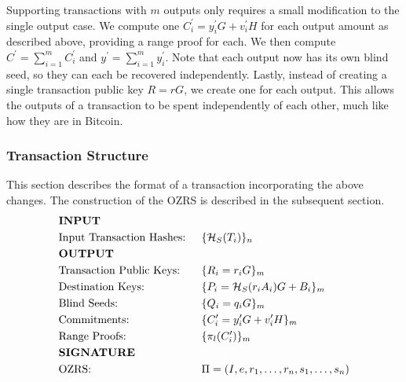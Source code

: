 \documentclass{article}
\newcommand{\sidx}{\ensuremath{*}}
\newcommand{\sx}{\ensuremath{x_\sidx}}
\newcommand{\oy}{\ensuremath{y^\prime}}
\newcommand{\oiy}{\ensuremath{y^\prime_i}}
\newcommand{\oC}{\ensuremath{C^\prime}}
\newcommand{\oiC}{\ensuremath{C^\prime_i}}
\newcommand{\oiv}{\ensuremath{v^\prime_i}}
\newcommand{\hs}{\ensuremath{\mathcal{H}_S}}
\newcommand{\hp}{\ensuremath{\mathcal{H}_P}}
\begin{document}
Supporting transactions with $m$ outputs only requires a small modification to
the single output case.  We compute one $\oiC = \oiy G + \oiv H$ for each output
amount as described above, providing a range proof for each.  We then compute
$\oC = \sum_{i=1}^m \oiC$ and $\oy = \sum_{i=1}^m \oiy$.  Note that each output
now has its own blind seed, so they can each be recovered independently.
Lastly, instead of creating a single transaction public key $R=rG$, we create
one for each output.  This allows the outputs of a transaction to be spent
independently of each other, much like how they are in Bitcoin.

\subsubsection{Transaction Structure}

This section describes the format of a transaction incorporating the above
changes.  The construction of the OZRS is described in the subsequent section.
\begin{align*} 
  & \text{\bf{INPUT}}       &&                                           \\%
  & \text{Input Transaction Hashes: } && \{ \hs(T_i) \}_n                 \\%
  & \text{\bf{OUTPUT}}     &&                                            \\%
  & \text{Transaction Public Keys: } && \{ R_i = r_i G \}_m               \\%
  & \text{Destination Keys: } && \{ P_i = \hs(r_i A_i)G + B_i \}_m        \\%
  & \text{Blind Seeds: } && \{ Q_i = q_i G \}_m                           \\%
  & \text{Commitments: } && \{ \oiC = \oiy G + \oiv H \}_m                \\%
  & \text{Range Proofs: } && \{ \pi_l(\oiC) \}_m                          \\%
  & \text{\bf{SIGNATURE}} &&                                              \\%
  & \text{OZRS: } && \Pi = (I, e, r_1, \dots, r_n, s_1, \dots, s_n)       \\%
\end{align*} 
\end{document}
